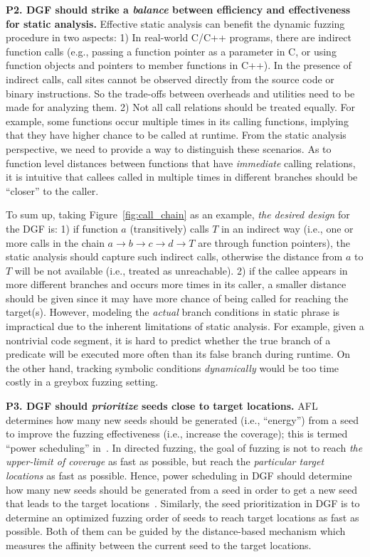 \textbf{P2. DGF should strike a \emph{balance} between efficiency and effectiveness for static analysis.}
Effective static analysis can benefit the dynamic fuzzing procedure in two aspects: 1) In real-world C/C++ programs, there are indirect function calls (e.g., passing a function pointer as a parameter in C, or using function objects and pointers to member functions in C++). In the presence of indirect calls, call sites cannot be observed directly from the source code or binary instructions. So the trade-offs between overheads and utilities need to be made for analyzing them. 2) Not all call relations should be treated equally. For example, some functions occur multiple times in its calling functions, implying  that they have higher chance to be called at runtime. From the static analysis perspective, we need to provide a way to distinguish these scenarios. As to function level distances between functions that have \emph{immediate} calling relations, it is intuitive that callees called in multiple times in different branches should be ``closer'' to the caller.


To sum up, taking Figure~\ref{fig:call_chain} as an example, \emph{the desired design} for the DGF is: 1) if function $a$ (transitively) calls $T$ in an indirect way (i.e., one or more calls in the chain $a\rightarrow\! b\!\rightarrow\! c\!\rightarrow\! d\!\rightarrow\! T$ are through function pointers), the static analysis should capture such indirect calls, otherwise the distance from $a$ to $T$ will be not available (i.e., treated as unreachable). 2) if the callee appears in more different branches and occurs more times in its caller, a smaller distance should be given since it may have more chance of being called for reaching the target(s). However, modeling the \emph{actual} branch conditions in static phrase is impractical due to the inherent limitations of static analysis. For example, given a nontrivial code segment, it is hard to predict whether the true branch of a predicate will be executed more often than its false branch during runtime. On the other hand, tracking symbolic conditions \emph{dynamically} would be too time costly in a greybox fuzzing setting.

\textbf{P3. DGF should \emph{prioritize} seeds close to target locations.}
 AFL determines how many new seeds should be generated (i.e., ``energy'') from a seed to improve the fuzzing effectiveness (i.e., increase the coverage); this is termed ``power scheduling'' in~\cite{Bohme:2016:CGF,Bohme:2017:DGF}. In directed fuzzing, the goal of fuzzing is not to reach \emph{the upper-limit of coverage} as fast as possible, but reach the \emph{particular target locations} as fast as possible. Hence, power scheduling in DGF should determine how many new seeds should be generated from a seed in order to get a new seed that leads to the target locations~\cite{Bohme:2017:DGF}. Similarly, the seed prioritization in DGF is to determine an optimized fuzzing order of seeds to reach target locations as fast as possible. Both of them can be guided by the distance-based mechanism which measures the affinity between the current seed to the target locations. 
 
